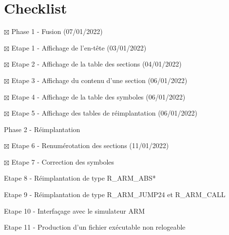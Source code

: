 \documentclass[11pt,letterpaper]{article}
\begin{document}
\section*{Checklist}
\begin{todolist}
    \item[$\boxtimes$] Phase 1 - Fusion (07/01/2022)
    \begin{todolist}
      \item[$\boxtimes$] Etape 1 - Affichage de l'en-tête  (03/01/2022)
      \item[$\boxtimes$] Etape 2 - Affichage de la table des sections (04/01/2022)
      \item[$\boxtimes$] Etape 3 - Affichage du contenu d'une section (06/01/2022)
      \item[$\boxtimes$] Etape 4 - Affichage de la table des symboles (06/01/2022)
      \item[$\boxtimes$] Etape 5 - Affichage des tables de réimplantation (06/01/2022)
    \end{todolist}
    \item Phase 2 - Réimplantation
    \begin{todolist}
        \item[$\boxtimes$] Etape 6 - Renumérotation des sections (11/01/2022)
        \item[$\boxtimes$] Etape 7 - Correction des symboles 
        \item Etape 8 - Réimplantation de type R\_ARM\_ABS*
        \item Etape 9 - Réimplantation de type R\_ARM\_JUMP24 et 
        R\_ARM\_CALL
        \item Etape 10 - Interfaçage avec le simulateur ARM 
        \item Etape 11 - Production d'un fichier exécutable non relogeable
      \end{todolist}
  \end{todolist}
\end{document}

